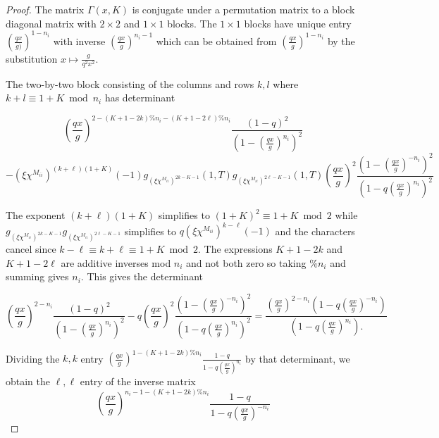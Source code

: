 \documentclass[11pt,letterpaper]{article}
\theoremstyle{definition}
\theoremstyle{remark}
\numberwithin{equation}{section}
\theoremstyle{dotless}
\begin{document}
\begin{proof} %

The matrix $\Gamma(x,K)$ is conjugate under a permutation matrix to a block diagonal matrix with $2 \times 2 $ and $1\times 1$ blocks. The $1\times 1$ blocks have unique entry $\left(\frac{ qx}{g)}\right)^{1-n_i}$ with inverse $\left(\frac{ qx}{g}\right)^{n_i-1}$ which can be obtained from $\left(\frac{ qx}{g}\right)^{1-n_i}$ by the substitution $x \mapsto \frac{ g}{q^2x^2}$.

The two-by-two block consisting of the columns and rows $k,l$ where $k+l \equiv 1 + K \bmod n_i$ has determinant

$$ \left( \frac{qx}{g} \right)^{ 2- (K+1-2k) \% n_i - (K+1-2\ell)\% n_i}\frac{ (1-q)^2}{ \left( 1 -  \left(\frac{qx}{g}\right)^{n_i}\right)^2} $$ $$- (\xi \chi^{M_{ii}})^{ (k+\ell) (1+K)} (-1) g_{ (\xi \chi^{M_{ii}} )^{2k-K-1}}(1,T)  g_{ (\xi \chi^{M_{ii}} )^{2\ell-K-1}}(1,T)\left( \frac{qx}{g}\right)^2  \frac{ \left( 1- \left( \frac{qx}{g} \right)^{-n_i}\right)^2}{ \left(1 - q \left( \frac{qx}{g} \right)^{n_i} \right)^2 } $$

The exponent $(k+\ell) (1+K)$ simplifies to $(1+K)^2 \equiv 1+K \bmod 2$ while $g_{ (\xi \chi^{M_{ii}} )^{2k-K-1}}  g_{ (\xi \chi^{M_{ii}} )^{2\ell-K-1}}$ simplifies to $ q (\xi \chi^{M_{ii}})^{ k-\ell} (-1)$ and the characters cancel since $k-\ell \equiv k+\ell \equiv 1+K \bmod 2$. The expressions $K+1-2k$ and $K+1-2\ell$ are additive inverses mod $n_i$ and not both zero so taking $\% n_i$ and summing gives $n_i$. This gives the determinant 

$$ \left( \frac{qx}{g} \right)^{ 2- n_i}\frac{ (1-q)^2}{ \left( 1 -  \left(\frac{qx}{g}\right)^{n_i}\right)^2} - q\left( \frac{qx}{g}\right)^2  \frac{ \left( 1- \left( \frac{qx}{g} \right)^{-n_i}\right)^2}{ \left(1 - q \left( \frac{qx}{g} \right)^{n_i} \right)^2 } = \frac{  \left(\frac{qx}{g}\right)^{2-n_i} \left( 1 -q \left( \frac{qx}{g}\right)^{-n_i} \right)}{ \left(1 - q \left( \frac{qx}{g} \right)^{n_i} \right). }$$

Dividing the $k,k$ entry $ \left(\frac{qx}{g}\right)^{1 - (K +1-2k)\% n_i} \frac{1-q}{1-q\left(\frac{q x}{g}\right)^{n_i}}$ by that determinant, we obtain the $\ell,\ell$ entry of the inverse matrix
$$ \left(\frac{qx}{g}\right)^{n_i -1 - (K +1-2k)\% n_i} \frac{1-q}{1-q\left(\frac{q x}{g}\right)^{-n_i}}$$


\end{proof}
\end{document}
